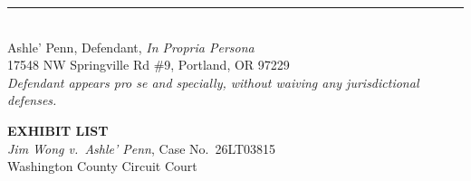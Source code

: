 \documentclass[10pt,letterpaper,oneside]{extarticle}
\begin{document}
\noindent\rule{3in}{0.5pt}\\
Ashle' Penn, Defendant, \textit{In Propria Persona}\\
17548 NW Springville Rd \#9, Portland, OR 97229\\[4pt]
\textit{Defendant appears pro se and specially,
	without waiving any jurisdictional defenses.}
\newpage
{}
\begin{center}
	{\normalsize\textbf{EXHIBIT LIST}}\\[4pt]
	{\normalsize\textit{Jim Wong v.\ Ashle' Penn},
		Case No.\ 26LT03815}\\[4pt]
	{\normalsize Washington County Circuit Court}
\end{center}
\vspace{0.5em}
\end{document}
